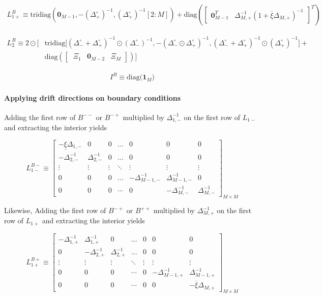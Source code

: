 \documentclass[11pt]{article}
\newcommand{\tridiag}{\ensuremath{\mathrm{tridiag}}}
\newcommand{\diag}{\ensuremath{\mathrm{diag}}}
\theoremstyle{definition}
\begin{document}
\begin{align}
{L}_{1+}^B \equiv
\tridiag \left(\mathbf{0}_{M-1}, -(\Delta_+^\circ )^{-1}, (\Delta_+^\circ)^{-1}[2:M]  \right) +
\diag\left( 
\begin{bmatrix}
\mathbf{0}_{M-1}^T &
\Delta^{-1}_{M,+} (1 + \overline{\xi} \Delta_{M,+})^{-1}
\end{bmatrix}^T
\right)
\end{align}

\begin{align}
{L}_{2}^B \equiv
2 \odot \Big[ & \text{tridiag} \Big[(\Delta_-^\circ + \Delta_+^\circ)^{-1} \odot (\Delta_{-}^\circ)^{-1}, 
-(\Delta_-^\circ \odot \Delta_+^\circ)^{-1},
(\Delta_-^\circ + \Delta_+^\circ)^{-1} \odot (\Delta_{+}^\circ)^{-1} \Big] + \\ & \diag\left(  
\begin{bmatrix} \
\Xi_1 & \mathbf{0}_{M-2} & \Xi_M
\end{bmatrix}
  \right) \Big]
\end{align}

\begin{align}
I^B \equiv  \text{diag($\mathbf{1}_M$)}
\end{align}


\paragraph{Applying drift directions on boundary conditions}
Adding the first row of $B^{--}$ or $B^{-+}$ multiplied by $\Delta_{1,-}^{-1}$ on the first row of $L_{1-}$ and extracting the interior yields

\begin{equation}
L_{1-}^{B-} \equiv \begin{bmatrix}
-\underline{\xi} \Delta_{1,-} &0&0&\dots&0&0&0\\
-\Delta_{2,-}^{-1}&\Delta_{2,-}^{-1}&0&\dots&0&0&0\\
\vdots&\vdots&\vdots&\ddots&\vdots&\vdots&\vdots\\
0&0&0&\dots&-\Delta_{M-1,-}^{-1}&\Delta_{M-1,-}^{-1}&0\\
0&0&0&\cdots&0&-\Delta_{M,-}^{-1}&\Delta_{M,-}^{-1}
\end{bmatrix}_{M\times M}
\end{equation}

Likewise,
Adding the first row of $B^{-+}$ or $B^{++}$ multiplied by $\Delta_{M,+}^{-1}$ on the first row of $L_{1+}$ and extracting the interior yields

\begin{equation}
L_{1+}^{B+} \equiv \begin{bmatrix}
-\Delta_{1,+}^{-1}&\Delta_{1,+}^{-1}&0&\dots&0&0&0\\
0&-\Delta_{2,+}^{-1}&\Delta_{2,+}^{-1}&\dots&0&0&0\\
\vdots&\vdots&\vdots&\ddots&\vdots&\vdots&\vdots\\
0&0&0&\cdots&0&-\Delta_{M-1,+}^{-1}&\Delta_{M-1,+}^{-1}\\
0&0&0&\cdots&0&0&-\overline{\xi} \Delta_{M,+}
\end{bmatrix}_{M\times M} \label{eq:L-1p-irregular-right}
\end{equation}
\end{document}
